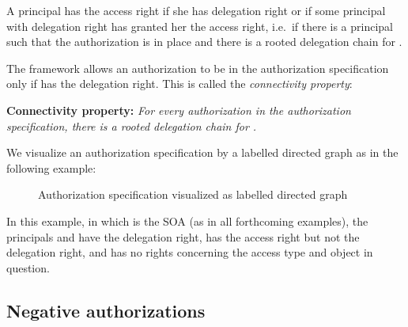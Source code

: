 \documentclass[runningheads]{llncs}
\begin{document}
A principal  has the access right if she has delegation right or if some principal with delegation right has granted her the access right, i.e.\ if there is a principal  such that the authorization  is in place and there is a rooted delegation chain for .

The framework allows an authorization  to be in the authorization specification only if  has the delegation right. This is called the \emph{connectivity property}:

\vspace{4mm}
\noindent \textbf{Connectivity property:} 
 \textit{For every authorization  in the authorization specification, there is a rooted delegation chain for .}
\vspace{4mm}

We visualize an authorization specification by a labelled directed graph as in the following example:

\vspace{-3mm}
\begin{figure}[H]
\center
{}
\caption{Authorization specification visualized as labelled directed graph}
\end{figure}
\vspace{-3mm}
In this example, in which  is the SOA (as in all forthcoming examples), the principals  and  have the delegation right,  has the access right but not the delegation right, and  has no rights concerning the access type and object in question.

\subsection{Negative authorizations}
\label{negative}
\end{document}
